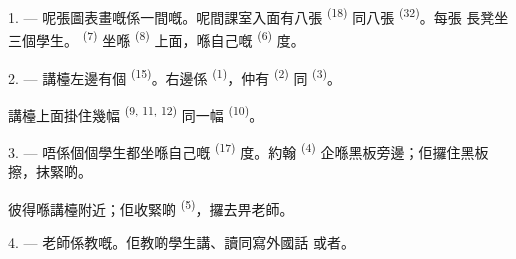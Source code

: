 %

\VUsaut{2.0mm}
\VUsaut{3.2mm}
\VUsaut{2.6mm}
\VUsaut{3.4mm}
\VUornamento{9pt}
\VUsaut{5.0mm}
\VUsaut{3.0mm}
\VUfilet{16mm}
\VUsaut{5.6mm}

\VUsaut{1.4mm}
\VUsaut{2.2mm}
\VUfilet{20mm}
\VUsaut{6.4mm}

\VUsaut{3.0mm}

1. --- 呢張圖表畫嘅係一間嘅。呢間課室入面有八張
 \textsuperscript{(18)} 同八張 \textsuperscript{(32)}。每張
長凳坐三個學生。 \textsuperscript{(7)} 坐喺
\textsuperscript{(8)} 上面，喺自己嘅 \textsuperscript{(6)} 度。

2. --- 講檯左邊有個 \textsuperscript{(15)}。右邊係
\textsuperscript{(1)}，仲有 \textsuperscript{(2)} 同
\textsuperscript{(3)}。

講檯上面掛住幾幅 \textsuperscript{(9, 11, 12)} 同一幅
\textsuperscript{(10)}。

3. --- 唔係個個學生都坐喺自己嘅 \textsuperscript{(17)} 度。約翰
\textsuperscript{(4)} 企喺黑板旁邊；佢攞住黑板擦，抹緊啲。

彼得喺講檯附近；佢收緊啲 \textsuperscript{(5)}，攞去畀老師。

4. --- 老師係教嘅。佢教啲學生講、讀同寫外國話
或者。

